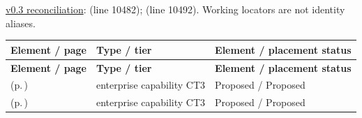 \hyperref[model:reconciliation]{v0.3 reconciliation}: \texttt{} (line 10482); \texttt{} (line 10492). Working locators are not identity aliases.
\begingroup\small\setlength{\TableWidth}{\dimexpr\linewidth-6\tabcolsep-4\arrayrulewidth\relax}
\begin{longtable}{|>{\raggedright\arraybackslash}p{0.52\TableWidth}|>{\raggedright\arraybackslash}p{0.2\TableWidth}|>{\raggedright\arraybackslash}p{0.28\TableWidth}|}
\hline\rowcolor{TableHead}\textbf{Element / page} & \textbf{Type / tier} & \textbf{Element / placement status}\\\hline\endfirsthead
\hline\rowcolor{TableHead}\textbf{Element / page} & \textbf{Type / tier} & \textbf{Element / placement status}\\\hline\endhead
\hline\endfoot
\nameref{cap:ec-operation-policy-resolution} (p.\,\pageref{cap:ec-operation-policy-resolution}) & enterprise capability CT3 & Proposed / Proposed\\\hline
\nameref{cap:ec-operation-bound-policy-enforcement} (p.\,\pageref{cap:ec-operation-bound-policy-enforcement}) & enterprise capability CT3 & Proposed / Proposed\\\hline
\end{longtable}\endgroup

